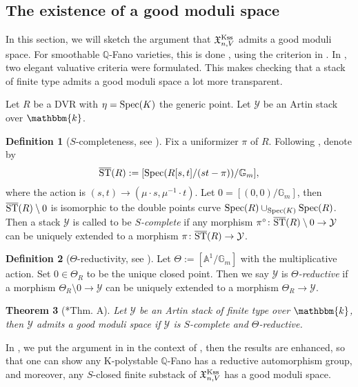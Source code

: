 \documentclass[12pt,reqno]{amsart}%
\newcommand{\bA}{{\mathbb{A} }}
\newcommand{\bG}{{\mathbb{G} }}
\newcommand{\cY}{{\mathcal{Y}}}
\newtheorem{thm}{Theorem}[section]
\theoremstyle{definition}
\newtheorem{defn}[thm]{Definition}
\theoremstyle{remark}
\newcommand{\bQ}{{\mathbb{Q}}}
\begin{document}
\subsection{The existence of a good moduli space}
In this section, we will sketch the argument that $\mathfrak X^{\rm Kss}_{n,V}$ admits a good moduli space. For smoothable $\bQ$-Fano varieties, this is done \cite{LWX19}, using the criterion in \cite{AFS17}.
In \cite{AHH18}, two elegant valuative criteria were formulated. This makes checking that a stack of finite type admits a good moduli space a lot more transparent. 

Let $R$ be a DVR with $\eta={\rm Spec}(K)$ the generic point. Let $\cY$ be an Artin stack over $\mathbbm{k}$.
\begin{defn}[{$S$-completeness, see \cite[Def. 3.37]{AHH18}}]
Fix a uniformizer $\pi$ of $R$.  Following \cite[(3.6)]{AHH18}, denote by 
\begin{eqnarray}\label{e-STR}
\overline{\rm ST}(R) := [{\rm Spec}(R[s, t]/(st - \pi))/\mathbb{G}_m],
\end{eqnarray}
where the action is $(s,t)\to (\mu\cdot s, \mu^{-1}\cdot t)$. Let $0=[(0,0)/\mathbb{G}_m]$, then $\overline{\rm ST}(R)\setminus 0$ is isomorphic to the double points curve ${{\rm Spec}(R)}\cup_{{\rm Spec}(K)}{\rm Spec}(R)$. Then a stack $\cY$ is called to be {\it $S$-complete} if any morphism $\pi^{\circ}\colon \overline{\rm ST}(R)\setminus 0\to \cY$ can be uniquely extended to a morphism  $\pi\colon \overline{\rm ST}(R)\to \cY$. 
\end{defn}
\begin{defn}[{$\Theta$-reductivity, see \cite[Def. 3.37]{AHH18}}] Let $\Theta:= [\bA^1/\bG_m]$ with the multiplicative action. Set $0 \in \Theta_R$ to be the unique closed point. 
Then we say $\cY$ is {\it $\Theta$-reductive} if a morphism $\Theta_R \setminus 0 \to \cY$ can be uniquely extended to a morphism $\Theta_R\to \cY$. 
\end{defn}
\begin{thm}[{\cite{AHH18}*{Thm. A}}]Let $\cY$ be an Artin stack of finite type over $\mathbbm{k}$, then $\cY$ admits a good moduli space if $\cY$ is $S$-complete and $\Theta$-reductive.
\end{thm}


In \cite{ABHX19}, we put the argument in \cite{BX19} in the context of \cite{AHH18}, then the results are enhanced, so that one can show any K-polystable $\mathbb{Q}$-Fano has a reductive automorphism group, and moreover, any $S$-closed finite substack of $\mathfrak X^{\rm Kss}_{n,V}$ has a good moduli space. 
\end{document}
